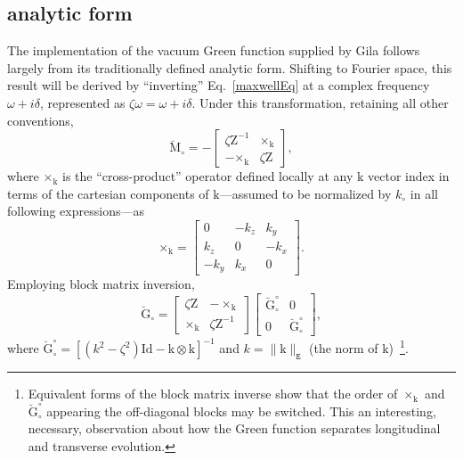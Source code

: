 \documentclass[reprint,aps,prb]{revtex4-2}
\newcommand{\bmm}[1]{\bm{\mathrm{#1}}}
\begin{document}
\subsection{analytic form}
\noindent
The implementation of the vacuum Green function supplied by Gila follows largely from its traditionally defined analytic form. 
Shifting to Fourier space, this result will be derived by ``inverting'' Eq.~\eqref{maxwellEq} at a complex frequency $\omega + i\delta$, represented as $\zeta \omega = \omega + i\delta$. 
Under this transformation, retaining all other conventions,
\begin{equation}
 	\breve{\bmm{M}}_{\circ} = 
 	-\begin{bmatrix}
 		\zeta\bmm{Z}^{-1} & \bm{\times}_{\bmm{k}} \\ 
 		-\bm{\times}_{\bmm{k}} & \zeta\bmm{Z}
	\end{bmatrix},
	\label{maxOptFourier}
\end{equation} 
where $\bm{\times}_{\bmm{k}}$ is the ``cross-product'' operator defined locally at any $\bmm{k}$ vector index in terms of the cartesian components of $\bmm{k}$---assumed to be normalized by $k_{\circ}$ in all following expressions---as 
\begin{equation}
	\bm{\times}_{\bmm{k}} =
	\begin{bmatrix}
		0 & -k_{z} & k_{y} \\
		k_{z} & 0 & -k_{x} \\
		-k_{y} & k_{x} & 0
	\end{bmatrix}.
\end{equation}
Employing block matrix inversion, 
\begin{equation}
	\breve{\bmm{G}}_{\circ}
	= 
	\begin{bmatrix}
		\zeta\bmm{Z} & -\times_{\bmm{k}} \\
		\times_{\bmm{k}} & \zeta\bmm{Z}^{-1}
	\end{bmatrix}
	\begin{bmatrix}
		\breve{\bmm{G}}^{\circ}_{\circ} & \bmm{0} \\
		\bmm{0} & \breve{\bmm{G}}^{\circ}_{\circ}
	\end{bmatrix},
\end{equation}
where $\breve{\bmm{G}}^{\circ}_{\circ} = \left[\left(k^{2}- \zeta^{2}\right)\bmm{Id} - \bmm{k}\otimes\bmm{k}\right]^{-1}$ and $k = \lVert \bmm{k}\rVert_{\mathtt{E}}$ (the norm of $\bmm{k}$)~\footnote{Equivalent forms of the block matrix inverse show that the order of $\times_{\bmm{k}}$ and $\breve{\bmm{G}}^{\circ}_{\circ}$ appearing the off-diagonal blocks may be switched. 
This an interesting, necessary, observation about how the Green function separates longitudinal and transverse evolution.}. 
\end{document}
